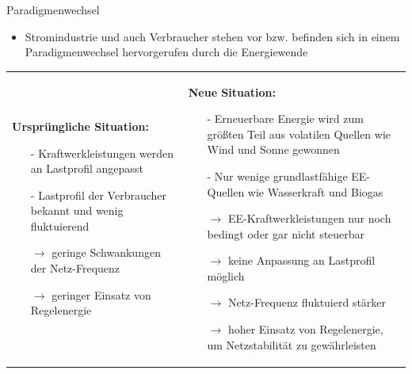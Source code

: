 \documentclass[aspectratio=1610, professionalfonts, 9pt]{beamer}
\begin{document}
\begin{frame}{Paradigmenwechsel}
\begin{itemize}
  \item Stromindustrie und auch Verbraucher
  stehen vor bzw. befinden sich
  in einem Paradigmenwechsel hervorgerufen durch die Energiewende
\end{itemize}
%
 \begin{tabular}{p{}p{}}
 \textbf{\textcolor{tugreen}{ Ursprüngliche Situation:}}

 \begin{itemize}
     \item[-] Kraftwerkleistungen werden an Lastprofil angepasst
     \item[-] Lastprofil der Verbraucher bekannt und wenig fluktuierend
         \item[$\rightarrow$] geringe Schwankungen der Netz-Frequenz
         \item[$\rightarrow$] geringer Einsatz von Regelenergie
   \end{itemize}
 &
 \textbf{\textcolor{tugreen}{Neue Situation:}}
    \begin{itemize}
      \item[-] Erneuerbare Energie wird zum größten Teil aus volatilen Quellen wie Wind und Sonne gewonnen
      \item[-] Nur wenige grundlastfähige EE-Quellen wie Wasserkraft und Biogas
      \item[$\rightarrow$] EE-Kraftwerkleistungen nur noch bedingt oder gar nicht steuerbar
      \item[$\rightarrow$] keine Anpassung an Lastprofil möglich
      \item[$\rightarrow$] Netz-Frequenz fluktuierd stärker
      \item[$\rightarrow$] hoher Einsatz von Regelenergie, um Netzstabilität zu gewährleisten
    \end{itemize}\\
  \end{tabular}
\end{frame}
\end{document}
